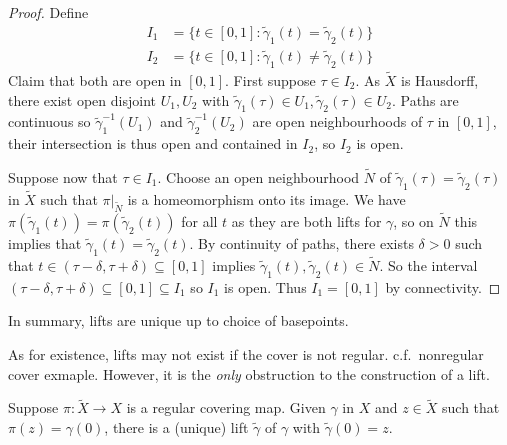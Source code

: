 \documentclass[a4paper]{article}
\begin{document}
\begin{proof}
  Define
  \begin{align*}
    I_1 &= \{t \in [0, 1]: \tilde \gamma_1(t) = \tilde \gamma_2(t)\} \\
    I_2 &= \{t \in [0, 1]: \tilde \gamma_1(t) \neq \tilde \gamma_2(t)\}
  \end{align*}
  Claim that both are open in \([0, 1]\). First suppose \(\tau \in I_2\). As \(\tilde X\) is Hausdorff, there exist open disjoint \(U_1, U_2\) with \(\tilde \gamma_1(\tau) \in U_1, \tilde \gamma_2(\tau) \in U_2\). Paths are continuous so \(\tilde \gamma_1^{-1}(U_1)\) and \(\tilde \gamma_2^{-1}(U_2)\) are open neighbourhoods of \(\tau\) in \([0, 1]\), their intersection is thus open and contained in \(I_2\), so \(I_2\) is open.

  Suppose now that \(\tau \in I_1\). Choose an open neighbourhood \(\tilde N\) of \(\tilde \gamma_1(\tau) = \tilde \gamma_2(\tau)\) in \(\tilde X\) such that \(\pi|_{\tilde N}\) is a homeomorphism onto its image. We have \(\pi(\tilde \gamma_1(t)) = \pi(\tilde \gamma_2(t))\) for all \(t\) as they are both lifts for \(\gamma\), so on \(\tilde N\) this implies that \(\tilde \gamma_1(t) = \tilde \gamma_2(t)\). By continuity of paths, there exists \(\delta > 0\) such that \(t \in (\tau - \delta, \tau + \delta) \subseteq [0, 1]\) implies \(\tilde \gamma_1(t), \tilde \gamma_2(t) \in \tilde N\). So the interval \((\tau - \delta, \tau + \delta) \subseteq [0, 1] \subseteq I_1\) so \(I_1\) is open. Thus \(I_1 = [0, 1]\) by connectivity.
\end{proof}

In summary, lifts are unique up to choice of basepoints.

As for existence, lifts may not exist if the cover is not regular. c.f.\ nonregular cover exmaple. However, it is the \emph{only} obstruction to the construction of a lift.

\begin{proposition}
  Suppose \(\pi: \tilde X \to X\) is a regular covering map. Given \(\gamma\) in \(X\) and \(z \in \tilde X\) such that \(\pi(z) = \gamma(0)\), there is a (unique) lift \(\tilde \gamma\) of \(\gamma\) with \(\tilde \gamma(0) = z\).
\end{proposition}
\end{document}
